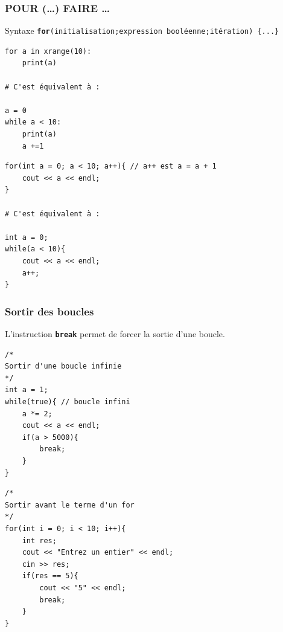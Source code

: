 \begin{frame}[fragile]
	\frametitle{POUR (\dots) FAIRE \dots}
    \begin{block}{Syntaxe}
        \texttt{\textbf{for}(initialisation{\huge;}expression booléenne{\huge;}itération) \{...\}}\\
    \end{block}

    \begin{minipage}{0.37\linewidth}
        \begin{verbatim}
for a in xrange(10):
    print(a)

# C'est équivalent à :

a = 0
while a < 10:
    print(a)
    a +=1
        \end{verbatim}
    \end{minipage}
    \hfill
    \begin{minipage}{0.57\linewidth}
        \begin{verbatim}
for(int a = 0; a < 10; a++){ // a++ est a = a + 1
    cout << a << endl;
}

# C'est équivalent à :

int a = 0;
while(a < 10){
    cout << a << endl;
    a++;
}
        \end{verbatim}
    \end{minipage}
\end{frame}

\begin{frame}[fragile]
    \frametitle{Sortir des boucles}
    L'instruction \texttt{\textbf{break}} permet de forcer la sortie d'une boucle.
    \vfill
    \begin{minipage}{0.37\linewidth}
    \begin{verbatim}
/*
Sortir d'une boucle infinie
*/
int a = 1;
while(true){ // boucle infini
    a *= 2;
    cout << a << endl;
    if(a > 5000){
        break;
    }
}
    \end{verbatim}
    \end{minipage}
    \hfill
    \begin{minipage}{0.57\linewidth}
    \begin{verbatim}
/*
Sortir avant le terme d'un for
*/
for(int i = 0; i < 10; i++){
    int res;
    cout << "Entrez un entier" << endl;
    cin >> res;
    if(res == 5){
        cout << "5" << endl;
        break;
    }
}
    \end{verbatim}
    \end{minipage}

\end{frame}

